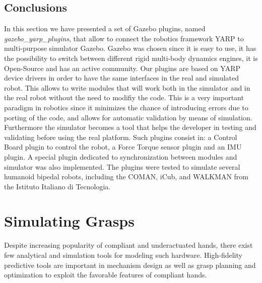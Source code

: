 \subsection{Conclusions}
In this section we have presented a set of Gazebo plugins, named \emph{gazebo\_yarp\_plugins}, that allow to connect the robotics framework YARP to multi-purpose simulator Gazebo. Gazebo was chosen since it is easy to use, it has the possibility to switch between different rigid multi-body dynamics engines, it is Open-Source and has an active community. Our plugins are based on YARP device drivers in order to have the same interfaces in the real and simulated robot. This allows to write modules that will work both in the simulator and in the real robot without the need to modifiy the code. This is a very important paradigm in robotics since it minimizes the chance of introducing errors due to porting of the code, and allows for automatic validation by means of simulation. Furthermore the simulator becomes a tool that helps the developer in testing and validating before using the real platform.
Such plugins consist in: a Control Board plugin to control the robot, a Force Torque sensor plugin and an IMU plugin. A special plugin dedicated to synchronization between modules and simulator was also implemented. The plugins were tested to simulate several humanoid bipedal robots, including the COMAN, iCub, and WALKMAN from the Istituto Italiano di Tecnologia.


\section{Simulating Grasps}

Despite increasing popularity of compliant and underactuated hands, there exist few analytical and simulation tools for modeling such hardware.  High-fidelity predictive tools are important in mechanism design as well as grasp planning and optimization to exploit the favorable features of compliant hands.

